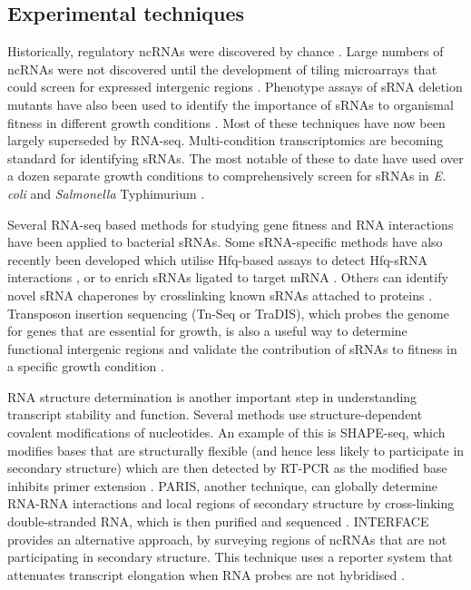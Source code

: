 \subsection{Experimental techniques}
Historically, regulatory ncRNAs were discovered by chance \citep{Thomason2010-ax}. Large numbers of ncRNAs were not discovered until the development of tiling microarrays that could screen for expressed intergenic regions \citep{Gottesman2004-ke}. Phenotype assays of sRNA deletion mutants have also been used to identify the importance of sRNAs to organismal fitness in different growth conditions \citep{Hobbs2010-lj,Santiviago2009-hn}. Most of these techniques have now been largely superseded by RNA-seq. Multi-condition transcriptomics are becoming standard for identifying sRNAs. The most notable of these to date have used over a dozen separate growth conditions to comprehensively screen for sRNAs in \textit{E. coli} \citep{Rau2015-gt} and \textit{Salmonella} Typhimurium \citep{Kroger2013-pg}.\par
Several RNA-seq based methods for studying gene fitness and RNA interactions have been applied to bacterial sRNAs. Some sRNA-specific methods have also recently been developed which utilise Hfq-based assays to detect Hfq-sRNA interactions \citep{Holmqvist2016-xhj}, or to enrich sRNAs ligated to target mRNA \citep{Melamed2016-xv}. Others can identify novel sRNA chaperones by crosslinking known sRNAs attached to proteins \citep{Smirnov2016-yt}. Transposon insertion sequencing (Tn-Seq or TraDIS), which probes the genome for genes that are essential for growth, is also a useful way to determine functional intergenic regions and validate the contribution of sRNAs to fitness in a specific growth condition \citep{Van_Opijnen2009-ns,Barquist2013-ili}. \par
RNA structure determination is another important step in understanding transcript stability and function. Several methods use structure-dependent covalent modifications of nucleotides. An example of this is SHAPE-seq, which modifies bases that are structurally flexible (and hence less likely to participate in secondary structure) which are then detected by RT-PCR as the modified base inhibits primer extension \citep{Tyrrell2013-ww,Watters2016-dm}. PARIS, another technique, can globally determine RNA-RNA interactions and local regions of secondary structure by cross-linking double-stranded RNA, which is then purified and sequenced \citep{Lu2016-qk}. INTERFACE provides an alternative approach, by surveying regions of ncRNAs that are not participating in secondary structure. This technique uses a reporter system that attenuates transcript elongation when RNA probes are not hybridised \citep{Mihailovic2018-kv}.

